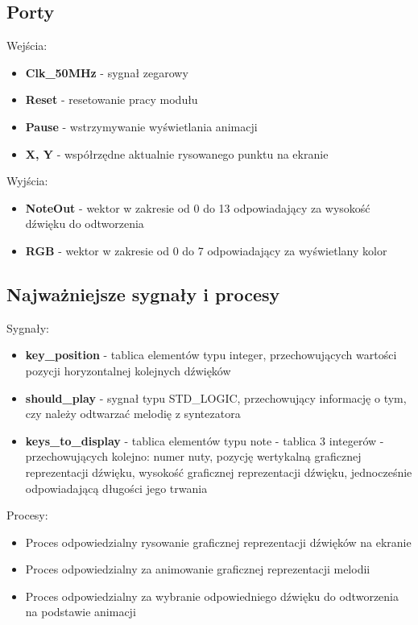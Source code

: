 \documentclass[a4paper]{report}
\begin{document}
		\subsection{Porty}
		{\Large Wejścia:}
			\begin{itemize}	 
				\item	\textbf{Clk\_50MHz} - sygnał zegarowy
				\item \textbf{Reset} - resetowanie pracy modułu
				\item 	\textbf{Pause} - wstrzymywanie wyświetlania animacji
				\item \textbf{X, Y} - współrzędne aktualnie rysowanego punktu na ekranie
			\end{itemize}
		{\Large Wyjścia:}
			\begin{itemize} 
				\item 	\textbf{NoteOut} - wektor w zakresie od 0 do 13 odpowiadający za wysokość dźwięku do odtworzenia
				\item 	\textbf{RGB} - wektor w zakresie od 0 do 7 odpowiadający za wyświetlany kolor
			\end{itemize}
		\subsection{Najważniejsze sygnały i procesy}
		{\Large Sygnały:}
			\begin{itemize}
				\item \textbf{key\_position} - tablica elementów typu integer, przechowujących wartości pozycji horyzontalnej kolejnych dźwięków
				\item \textbf{should\_play} - sygnał typu STD\_LOGIC, przechowujący informację o tym, czy należy odtwarzać melodię z syntezatora
				\item \textbf{keys\_to\_display} - tablica elementów typu note - tablica 3 integerów - przechowujących kolejno: numer nuty, pozycję wertykalną graficznej reprezentacji dźwięku, wysokość graficznej reprezentacji dźwięku, jednocześnie odpowiadającą długości jego trwania
			\end{itemize}
		{\Large Procesy:}
			\begin{itemize}
			\item Proces odpowiedzialny rysowanie graficznej reprezentacji dźwięków na ekranie\\
						
			\item Proces odpowiedzialny za animowanie graficznej reprezentacji melodii\\
									
			\item Proces odpowiedzialny za wybranie odpowiedniego dźwięku do odtworzenia na podstawie animacji\\
									
			\end{itemize}
	
\end{document}
